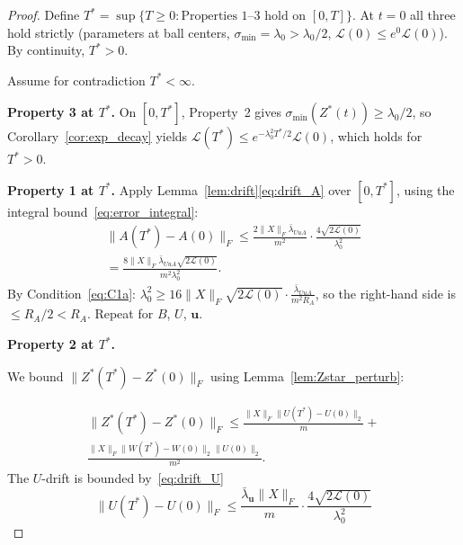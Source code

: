 \documentclass[twoside]{article}
\newcommand{\Lc}{\mathcal{L}}
\newcommand{\ub}{\mathbf{u}}
\newcommand{\sigmamin}{\sigma_{\min}}
\begin{document}


\begin{proof}
Define $T^* = \sup\{T \geq 0: \text{Properties 1--3 hold on } [0,T]\}$.
At $t=0$ all three hold strictly (parameters at ball centers, $\sigmamin = \lambda_0 > \lambda_0/2$,
$\Lc(0) \leq e^0\Lc(0)$).  By continuity, $T^* > 0$.

Assume for contradiction $T^* < \infty$.

\textbf{Property 3 at $T^*$.}
On $[0,T^*]$, Property~2 gives $\sigmamin(Z^*(t)) \geq \lambda_0/2$, so
Corollary~\ref{cor:exp_decay} yields $\Lc(T^*) \leq e^{-\lambda_0^2 T^*/2}\Lc(0)$, which
holds for $T^* > 0$.

\textbf{Property 1 at $T^*$.}
Apply Lemma~\ref{lem:drift}\eqref{eq:drift_A} over $[0,T^*]$, using the integral
bound~\eqref{eq:error_integral}:
\begin{align*}
\|A(T^*)-A(0)\|_F
  \leq \frac{2\|X\|_F\bar\lambda_{Uu A}}{m^2}\cdot\frac{4\sqrt{2\Lc(0)}}{\lambda_0^2} \\
  = \frac{8\|X\|_F\bar\lambda_{Uu A}\sqrt{2\Lc(0)}}{m^2\lambda_0^2}.
\end{align*}
By Condition~\eqref{eq:C1a}: $\lambda_0^2 \geq 16\|X\|_F\sqrt{2\Lc(0)}\cdot\frac{\bar\lambda_{Uu A}}{m^2 R_A}$,
so the right-hand side is $\leq R_A/2 < R_A$.  Repeat for $B$, $U$, $\ub$.

\textbf{Property 2 at $T^*$.}

We bound $\|Z^*(T^*) - Z^*(0)\|_F$ using Lemma~\ref{lem:Zstar_perturb}:

\begin{align*}
    \|Z^*(T^*)-Z^*(0)\|_F \leq \frac{\|X\|_F\|U(T^*)-U(0)\|_2}{m} + \\ \frac{\|X\|_F\|W(T^*)-W(0)\|_2\|U(0)\|_2}{m^2}.
\end{align*}
The $U$-drift is bounded
by~\eqref{eq:drift_U}
$$\|U(T^*)-U(0)\|_F \leq \frac{\bar\lambda_\mathbf{u}\|X\|_F}{m}\cdot\frac{4\sqrt{2\mathcal{L}(0)}}{\lambda_0^2}$$



\end{proof}
\end{document}
